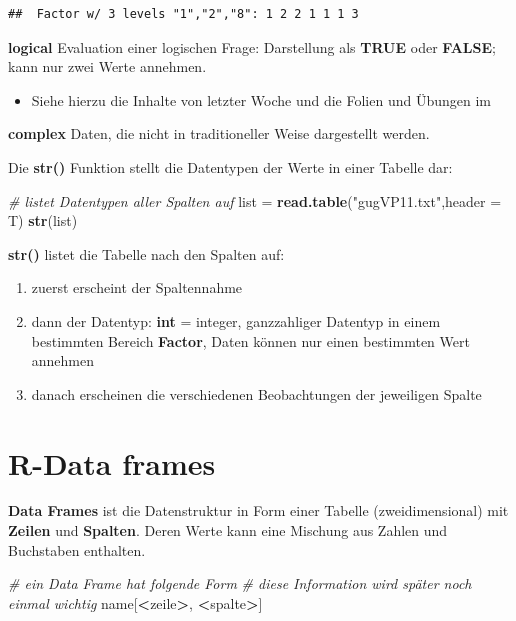 \documentclass[]{book}
\newenvironment{Shaded}{\begin{snugshade}}{\end{snugshade}}
\newcommand{\KeywordTok}[1]{\textcolor[rgb]{0.13,0.29,0.53}{\textbf{#1}}}
\newcommand{\DataTypeTok}[1]{\textcolor[rgb]{0.13,0.29,0.53}{#1}}
\newcommand{\StringTok}[1]{\textcolor[rgb]{0.31,0.60,0.02}{#1}}
\newcommand{\CommentTok}[1]{\textcolor[rgb]{0.56,0.35,0.01}{\textit{#1}}}
\newcommand{\OperatorTok}[1]{\textcolor[rgb]{0.81,0.36,0.00}{\textbf{#1}}}
\newcommand{\NormalTok}[1]{#1}
\providecommand{\tightlist}{%
  \setlength{\itemsep}{0pt}\setlength{\parskip}{0pt}}
\begin{document}
\begin{verbatim}
##  Factor w/ 3 levels "1","2","8": 1 2 2 1 1 1 3
\end{verbatim}

\textbf{logical} Evaluation einer logischen Frage: Darstellung als
\textbf{TRUE} oder \textbf{FALSE}; kann nur zwei Werte annehmen.

\begin{itemize}
\tightlist
\item
  Siehe hierzu die Inhalte von letzter Woche und die Folien und Übungen
  im
\end{itemize}

\textbf{complex} Daten, die nicht in traditioneller Weise dargestellt
werden.

Die \textbf{str()} Funktion stellt die Datentypen der Werte in einer
Tabelle dar:

\begin{Shaded}
\begin{Highlighting}[]
\CommentTok{# listet Datentypen aller Spalten auf}
\NormalTok{list =}\StringTok{ }\KeywordTok{read.table}\NormalTok{(}\StringTok{"gugVP11.txt"}\NormalTok{,}\DataTypeTok{header =}\NormalTok{ T)}
\KeywordTok{str}\NormalTok{(list)}
\end{Highlighting}
\end{Shaded}

\textbf{str()} listet die Tabelle nach den Spalten auf:

\begin{enumerate}
\def\labelenumi{\arabic{enumi}.}
\tightlist
\item
  zuerst erscheint der Spaltennahme
\item
  dann der Datentyp: \textbf{int} = integer, ganzzahliger Datentyp in
  einem bestimmten Bereich \textbf{Factor}, Daten können nur einen
  bestimmten Wert annehmen
\item
  danach erscheinen die verschiedenen Beobachtungen der jeweiligen
  Spalte
\end{enumerate}

\section{R-Data frames}\label{r-data-frames}

\textbf{Data Frames} ist die Datenstruktur in Form einer Tabelle
(zweidimensional) mit \textbf{Zeilen} und \textbf{Spalten}. Deren Werte
kann eine Mischung aus Zahlen und Buchstaben enthalten.

\begin{Shaded}
\begin{Highlighting}[]
\CommentTok{# ein Data Frame hat folgende Form}
\CommentTok{# diese Information wird später noch einmal wichtig}
\NormalTok{name[}\OperatorTok{<}\NormalTok{zeile}\OperatorTok{>}\NormalTok{, }\OperatorTok{<}\NormalTok{spalte}\OperatorTok{>}\NormalTok{]}
\end{Highlighting}
\end{Shaded}
\end{document}
